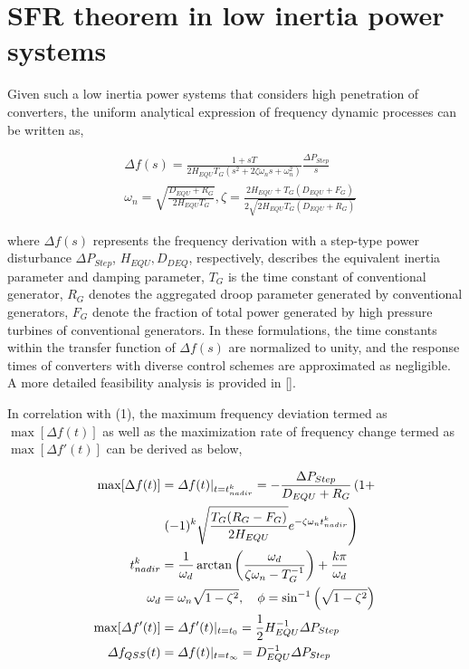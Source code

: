 \documentclass[lettersize,journal]{IEEEtran}
\begin{document}
\section{SFR theorem in low inertia power systems}

Given such a low inertia power systems that considers high penetration of converters, the uniform analytical expression of frequency dynamic processes can be written as,

\begin{subequations}
\begin{align}
  \!\!\!\!&\varDelta f(s) \!=\! \frac{1+sT}{2H_{EQU}T_{G}(s^2 + 2\zeta \omega_n s + \omega_n^2)}\frac{\varDelta P_{Step}}{s}\label{eq:Lsfr}\\
  \!\!\!\!&\omega_n \!=\! \sqrt{\!\frac{D_{EQU} \!+\! R_G}{2H_{EQU}T_G}}, \zeta \!=\! \frac{2H_{EQU}  \!+\! T_G(D_{EQU} \!+\! F_G)}{2\sqrt{2H_{EQU}T_G(D_{EQU} \!+\! R_G)}}
\end{align}
\end{subequations}

\noindent
where $\varDelta f(s)$ represents the frequency derivation with a step-type power disturbance $\varDelta P_{Step}$, $H_{EQU},\! D_{DEQ}$, respectively, describes the equivalent inertia parameter and damping parameter, $T_G$ is the time constant of conventional generator, $R_G$ denotes the aggregated droop parameter generated by conventional generators, $F_G$ denote the fraction of total power generated by high pressure turbines of conventional generators. In these formulations, the time constants within the transfer function of $\varDelta f(s)$ are normalized to unity, and the response times of converters with diverse control schemes are approximated as negligible. A more detailed feasibility analysis is provided in [].

In correlation with (1), the maximum frequency deviation termed as $\max[ \varDelta f(t)]$ as well as the maximization rate of frequency change termed as $\max[\varDelta f'(t)]$ can be derived as below,

\begin{subequations}
\begin{align}
    \max[\Delta f(t)] &= \varDelta f(t)|_{t=t_{nadir}^k} = -\frac{\Delta P_{Step}}{D_{EQU} + R_G} \left ( 1 + \right.\notag \\
                      &\left. (-1)^k \sqrt{\frac{T_G(R_G - F_G)}{2H_{EQU}}} e^{-\zeta \omega_n t_{nadir}^k} \right) \label{eq:max_delta_f}\\
    t_{nadir}^k &= \frac{1}{\omega_d} \arctan \left( \frac{\omega_d}{\zeta \omega_n - T_G^{-1}} \right) + \frac{k\pi}{\omega_d}\notag  \\
    \omega_d &= \omega_n \sqrt{1 - \zeta^2}, \quad \phi = \sin^{-1} \left( \sqrt{1 - \zeta^2} \right) \notag\\
  \max[\varDelta f'(t)] &= \varDelta f'(t)|_{t=t_{0}} = \frac{1}{2} H_{EQU}^{-1}\varDelta P_{Step} \label{eq:max_rocof}\\
  \varDelta f_{QSS}(t) &= \varDelta f(t)|_{t=t_{\infty}} = {D_{EQU}^{-1}\varDelta P_{Step}} \label{eq:qss}
\end{align}
\end{subequations}
  
\end{document}
